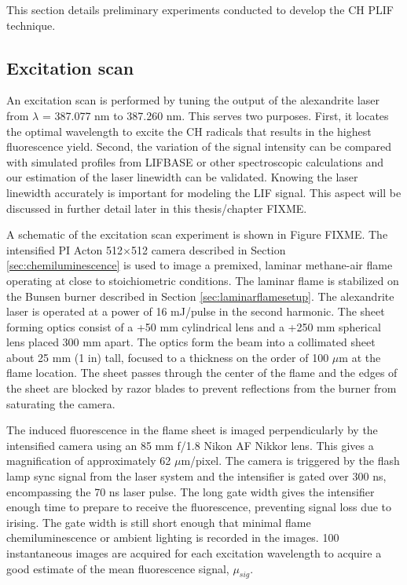 This section details preliminary experiments conducted to develop the CH PLIF technique.

\subsection{Excitation scan}
\label{sec:excitationscan}

An excitation scan is performed by tuning the output of the alexandrite laser from \(\lambda\) = 387.077 nm to 387.260 nm.
This serves two purposes.
First, it locates the optimal wavelength to excite the CH radicals that results in the highest fluorescence yield.
Second, the variation of the signal intensity can be compared with simulated profiles from LIFBASE or other spectroscopic calculations and our estimation of the laser linewidth can be validated.
Knowing the laser linewidth accurately is important for modeling the LIF signal.
This aspect will be discussed in further detail later in this thesis/chapter FIXME.

A schematic of the excitation scan experiment is shown in Figure FIXME.
The intensified PI Acton 512\(\times\)512 camera described in Section \ref{sec:chemiluminescence} is used to image a premixed, laminar methane-air flame operating at close to stoichiometric conditions.
The laminar flame is stabilized on the Bunsen burner described in Section \ref{sec:laminarflamesetup}.
The alexandrite laser is operated at a power of 16 mJ/pulse in the second harmonic.
The sheet forming optics consist of a +50 mm cylindrical lens and a +250 mm spherical lens placed 300 mm apart.
The optics form the beam into a collimated sheet about 25 mm (1 in) tall, focused to a thickness on the order of 100 \(\mu\)m at the flame location.
The sheet passes through the center of the flame and the edges of the sheet are blocked by razor blades to prevent reflections from the burner from saturating the camera.

The induced fluorescence in the flame sheet is imaged perpendicularly by the intensified camera using an 85 mm f/1.8 Nikon AF Nikkor lens.
This gives a magnification of approximately 62 \(\mu\)m/pixel.
The camera is triggered by the flash lamp sync signal from the laser system and the intensifier is gated over 300 ns, encompassing the 70 ns laser pulse.
The long gate width gives the intensifier enough time to prepare to receive the fluorescence, preventing signal loss due to irising.
The gate width is still short enough that minimal flame chemiluminescence or ambient lighting is recorded in the images.
100 instantaneous images are acquired for each excitation wavelength to acquire a good estimate of the mean fluorescence signal, \(\mu_{sig}\).

